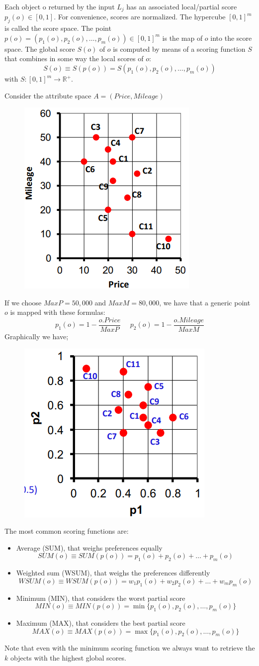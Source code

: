 \documentclass[12pt, a4paper]{report}
\newtheorem[style=M,bodystyle=\normalfont]{theorem}{Theorem}
\newtheorem[style=M,bodystyle=\normalfont]{corollary}{Corollary}
\newtheorem[style=M,bodystyle=\normalfont]{lemma}{Lemma}
\newtheorem[style=M,bodystyle=\normalfont]{definition}{Definition}
\begin{document}
    Each object o returned by the input $L_j$ has an associated local/partial score $p_j(o) \in [0,1]$. For convenience, scores are normalized. The hypercube $[0,1]^m$ 
    is called the score space. The point $p(o) = (p_1(o),p_2(o),\dots,p_m(o)) \in [0,1]^m$ is the map of $o$ into the score space. The global score $S(o)$ of $o$ is 
    computed by means of a scoring function $S$ that combines in some way the local scores of $o$:
    \[S(o) \equiv  S(p(o)) = S(p_1(o),p_2(o),\dots,p_m(o))\]
    with $S:[0,1]^m \rightarrow \mathbb{R}^{+}$. 
    \begin{example}
        Consider the attribute space $A = (Price,Mileage)$
        \begin{figure}[H]
            \centering
            \includegraphics[width=0.25\linewidth]{images/ex1.png}
        \end{figure}
        If we choose $MaxP = 50,000$ and $MaxM = 80,000$, we have that a generic point $o$ is mapped with these formulas: 
        \[p_1(o) = 1 - \dfrac{o.Price}{MaxP} \:\:\:\:\:\: p_2(o) = 1 - \dfrac{o.Mileage}{MaxM}\]
        Graphically we have; 
        \begin{figure}[H]
            \centering
            \includegraphics[width=0.3\linewidth]{images/ex2.png}
        \end{figure}
    \end{example}
    The most common scoring functions are: 
    \begin{itemize}
        \item Average (SUM), that weighs preferences equally
            \[SUM(o) \equiv SUM(p(o)) = p_1(o) + p_2(o) + \dots + p_m(o)\]
        \item Weighted sum (WSUM), that weighs the preferences differently
            \[WSUM(o) \equiv WSUM(p(o)) = w_1p_1(o) + w_2p_2(o) + \dots + w_mp_m(o)\]
        \item Minimum (MIN), that considers the worst partial score
            \[MIN(o) \equiv MIN(p(o)) = \min\{p_1(o),p_2(o),\dots, p_m(o)\}\]
        \item Maximum (MAX), that considers the best partial score
            \[MAX(o) \equiv MAX(p(o)) = \max\{p_1(o),p_2(o),\dots, p_m(o)\}\]       
    \end{itemize}
    Note that even with the minimum scoring function we always want to retrieve the $k$ objects with the highest global scores.
\end{document}
